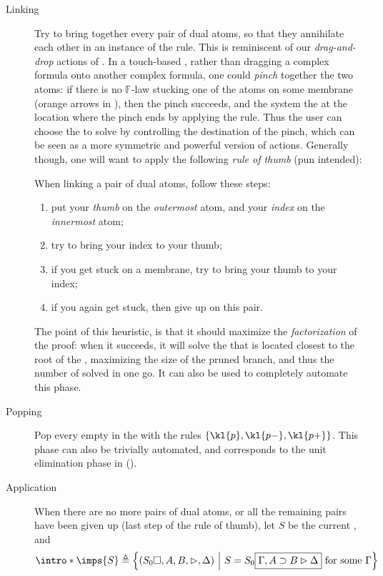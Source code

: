 \begin{scope}
\begin{description}
  \item[Linking] Try to bring together every pair of dual atoms, so
    that they annihilate each other in an instance of the  rule. This
    is reminiscent of our \emph{drag-and-drop} actions of . In a
    touch-based , rather than dragging a complex formula onto another
    complex formula, one could \emph{pinch} together the two atoms: if there is
    no $\mathbb{F}$-law stucking one of the atoms on some membrane (orange
    arrows in ), then the pinch succeeds, and the
    system  the  at the location where
    the pinch ends by applying the  rule. Thus the user can choose
    the  to solve by controlling the destination of the pinch, which
    can be seen as a more symmetric and powerful version of  actions.
    Generally though, one will want to apply the following \emph{rule of thumb}
    (pun intended):
    \begin{fact}
      When linking a pair of dual atoms, follow these steps:
      \begin{enumerate}
        \item put your \emph{thumb} on the \emph{outermost} atom, and your
              \emph{index} on the \emph{innermost} atom;
        \item try to bring your index to your thumb;
        \item if you get stuck on a membrane, try to bring your thumb to your
              index;
        \item if you again get stuck, then give up on this pair.
      \end{enumerate}
    \end{fact}
    The point of this heuristic, is that it should maximize the
    \emph{factorization} of the proof: when it succeeds, it will solve the
     that is located closest to the root of the , maximizing the size
    of the pruned branch, and thus the number of  solved in one go. It
    can also be used to completely automate this phase.

  \item[Popping] Pop every  empty  in the  with the
  rules $\{\kl{p},\kl{p{-}},\kl{p{+}}\}$. This phase can also be trivially
  automated, and corresponds to the unit elimination phase in 
  ().

  \item[Application] When there are no more pairs of dual atoms, or all
    the remaining pairs have been given up (last step of the rule of thumb), let
    $S$ be the current , and
    $$\intro*\imps{S} \defeq \compr{(S_0\hole, A, B, \J, \Delta)}{S = S_0\select{\Gamma,
          A \limp B \J \Delta} \text{ for some $\Gamma$}}$$


\end{description}
\end{scope}
